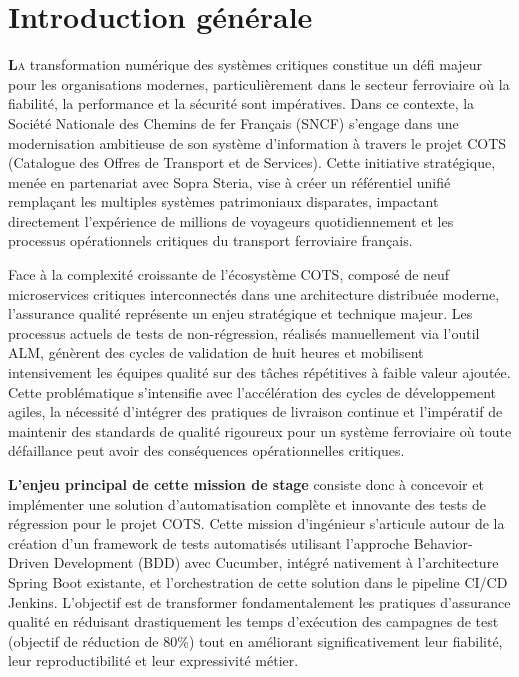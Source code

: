 
\chapter*{Introduction générale}

\lettrine{\textbf{L}}\lowercase{a} transformation numérique des systèmes critiques constitue un défi majeur pour les organisations modernes, particulièrement dans le secteur ferroviaire où la fiabilité, la performance et la sécurité sont impératives. Dans ce contexte, la Société Nationale des Chemins de fer Français (SNCF) s'engage dans une modernisation ambitieuse de son système d'information à travers le projet COTS (Catalogue des Offres de Transport et de Services). Cette initiative stratégique, menée en partenariat avec Sopra Steria, vise à créer un référentiel unifié remplaçant les multiples systèmes patrimoniaux disparates, impactant directement l'expérience de millions de voyageurs quotidiennement et les processus opérationnels critiques du transport ferroviaire français.

Face à la complexité croissante de l'écosystème COTS, composé de neuf microservices critiques interconnectés dans une architecture distribuée moderne, l'assurance qualité représente un enjeu stratégique et technique majeur. Les processus actuels de tests de non-régression, réalisés manuellement via l'outil ALM, génèrent des cycles de validation de huit heures et mobilisent intensivement les équipes qualité sur des tâches répétitives à faible valeur ajoutée. Cette problématique s'intensifie avec l'accélération des cycles de développement agiles, la nécessité d'intégrer des pratiques de livraison continue et l'impératif de maintenir des standards de qualité rigoureux pour un système ferroviaire où toute défaillance peut avoir des conséquences opérationnelles critiques.

\textbf{L'enjeu principal de cette mission de stage} consiste donc à concevoir et implémenter une solution d'automatisation complète et innovante des tests de régression pour le projet COTS. Cette mission d'ingénieur s'articule autour de la création d'un framework de tests automatisés utilisant l'approche Behavior-Driven Development (BDD) avec Cucumber, intégré nativement à l'architecture Spring Boot existante, et l'orchestration de cette solution dans le pipeline CI/CD Jenkins. L'objectif est de transformer fondamentalement les pratiques d'assurance qualité en réduisant drastiquement les temps d'exécution des campagnes de test (objectif de réduction de 80\%) tout en améliorant significativement leur fiabilité, leur reproductibilité et leur expressivité métier.

